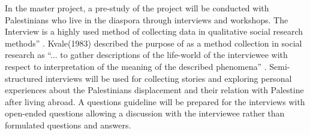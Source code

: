   
In the master project, a pre-study of the project will be conducted with Palestinians who live in the diaspora through interviews and workshops.  The Interview is a highly used method of collecting data in qualitative social research methods” \citep{Anyan2013}.  Kvale(1983)  described the purpose of as a method collection in social research as “... to gather descriptions of the life-world of the interviewee with respect to interpretation of the meaning of the described phenomena”  \citep{Kvale1983}. Semi-structured interviews will be used for collecting stories and exploring personal experiences about the Palestinians displacement and their relation with Palestine after living abroad. A questions guideline will be prepared for the interviews with  open-ended questions allowing a discussion with the interviewee rather than  formulated questions and answers.

